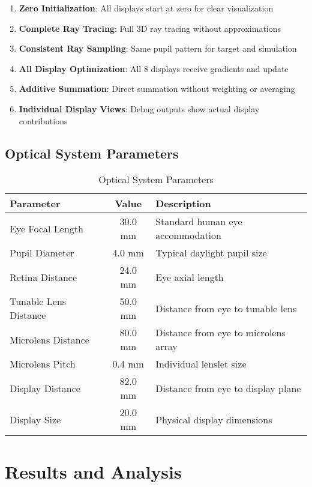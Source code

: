 \documentclass[12pt,a4paper]{article}
\begin{document}
\begin{enumerate}
    \item \textbf{Zero Initialization}: All displays start at zero for clear visualization
    \item \textbf{Complete Ray Tracing}: Full 3D ray tracing without approximations
    \item \textbf{Consistent Ray Sampling}: Same pupil pattern for target and simulation
    \item \textbf{All Display Optimization}: All 8 displays receive gradients and update
    \item \textbf{Additive Summation}: Direct summation without weighting or averaging
    \item \textbf{Individual Display Views}: Debug outputs show actual display contributions
\end{enumerate}

\subsection{Optical System Parameters}

\begin{table}[H]
\centering
\begin{tabular}{|l|c|l|}
\hline
\textbf{Parameter} & \textbf{Value} & \textbf{Description} \\
\hline
Eye Focal Length & 30.0 mm & Standard human eye accommodation \\
Pupil Diameter & 4.0 mm & Typical daylight pupil size \\
Retina Distance & 24.0 mm & Eye axial length \\
Tunable Lens Distance & 50.0 mm & Distance from eye to tunable lens \\
Microlens Distance & 80.0 mm & Distance from eye to microlens array \\
Microlens Pitch & 0.4 mm & Individual lenslet size \\
Display Distance & 82.0 mm & Distance from eye to display plane \\
Display Size & 20.0 mm & Physical display dimensions \\
\hline
\end{tabular}
\caption{Optical System Parameters}
\end{table}

\section{Results and Analysis}
\end{document}
